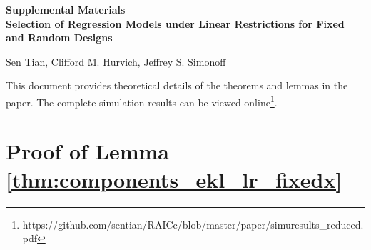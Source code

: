 \beginsupplement
\appendix
{}
\begin{center}
\textbf{\large Supplemental Materials \\
Selection of Regression Models under Linear Restrictions for Fixed and Random Designs}

Sen Tian, Clifford M. Hurvich, Jeffrey S. Simonoff
\end{center}

This document provides theoretical details of the theorems and lemmas in the paper. The complete simulation results can be viewed online\footnote{https://github.com/sentian/RAICc/blob/master/paper/simuresults_reduced.pdf}.




\section{Proof of Lemma \ref{thm:components_ekl_lr_fixedx}}
